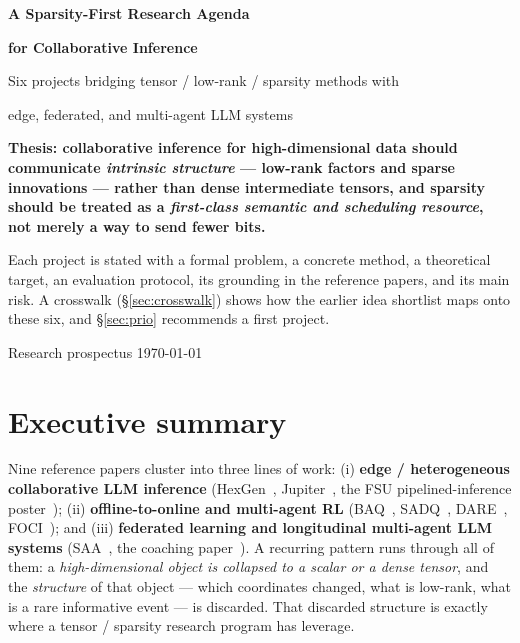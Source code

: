 \documentclass[11pt]{article}
\begin{document}
\begin{titlepage}
\centering
\vspace*{1.8cm}
{\Huge\bfseries\color{accent} A Sparsity-First Research Agenda\par}
\vspace{0.35cm}
{\Large\bfseries\color{accent} for Collaborative Inference\par}
\vspace{0.9cm}
{\large Six projects bridging tensor / low-rank / sparsity methods with\par edge, federated, and multi-agent LLM systems\par}
\vspace{1.6cm}
\begin{tcolorbox}[colback=accent3!8,colframe=accent3,width=0.9\textwidth,arc=3pt]
\centering\bfseries
Thesis: collaborative inference for high-dimensional data should communicate
\emph{intrinsic structure} --- low-rank factors and sparse innovations ---
rather than dense intermediate tensors, and sparsity should be treated as a
\emph{first-class semantic and scheduling resource}, not merely a way to send fewer bits.
\end{tcolorbox}
\vspace{1.4cm}
\begin{tcolorbox}[colback=softgray,colframe=accent,width=0.9\textwidth,arc=3pt]
\centering
Each project is stated with a formal problem, a concrete method, a theoretical
target, an evaluation protocol, its grounding in the reference papers, and its
main risk. A crosswalk (\S\ref{sec:crosswalk}) shows how the earlier idea
shortlist maps onto these six, and \S\ref{sec:prio} recommends a first project.
\end{tcolorbox}
\vfill
{\normalsize Research prospectus \;\textbullet\; \today\par}
\end{titlepage}

\tableofcontents
\newpage

\section{Executive summary}

Nine reference papers cluster into three lines of work: (i) \textbf{edge / heterogeneous
collaborative LLM inference} (HexGen~\cite{hexgen}, Jupiter~\cite{jupiter}, the FSU
pipelined-inference poster~\cite{poster}); (ii) \textbf{offline-to-online and multi-agent
RL} (BAQ~\cite{baq}, SADQ~\cite{sadq}, DARE~\cite{dare}, FOCI~\cite{foci}); and (iii)
\textbf{federated learning and longitudinal multi-agent LLM systems}
(SAA~\cite{saa}, the coaching paper~\cite{coaching}). A recurring pattern runs through all
of them: a \emph{high-dimensional object is collapsed to a scalar or a dense tensor}, and
the \emph{structure} of that object --- which coordinates changed, what is low-rank, what
is a rare informative event --- is discarded. That discarded structure is exactly where a
tensor / sparsity research program has leverage.
\end{document}
